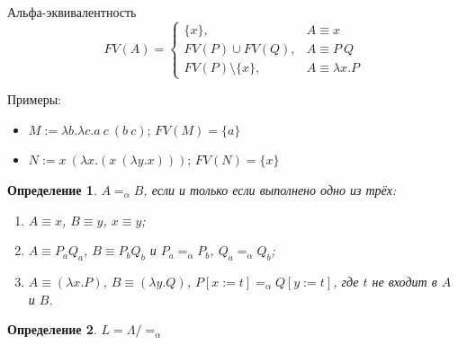 \documentclass[aspectratio=169]{beamer}
\newtheorem{dfn}{Определение}[section]
\begin{document}
\begin{frame}{Альфа-эквивалентность}
$$FV(A) = \left\{\begin{array}{ll} \{x\}, & A \equiv x\\
  FV(P)\cup FV(Q), & A \equiv P\ Q\\
  FV(P)\setminus\{x\}, & A \equiv \lambda x.P\end{array}\right.$$

Примеры: 
\begin{itemize}
\item $M := \lambda b.\lambda c.a\ c\ (b\ c)$; $FV(M) = \{a\}$
\item $N := x\ (\lambda x.(x\ (\lambda y.x)))$; $FV(N) = \{x\}$
\end{itemize}

\begin{dfn}$A=_\alpha B$, если и только если выполнено одно из трёх:
\begin{enumerate}
\item $A \equiv x$, $B \equiv y$, $x \equiv y$;
\item $A \equiv P_a Q_a$, $B \equiv P_b Q_b$ и $P_a =_\alpha P_b$, $Q_a =_\alpha Q_b$;
\item $A \equiv (\lambda x.P)$, $B \equiv (\lambda y.Q)$, $P[x := t] =_\alpha Q[y := t]$, где $t$ не входит в $A$ и $B$.
\end{enumerate}\end{dfn}

\begin{dfn}$L = \Lambda/=_\alpha$\end{dfn}
\end{frame}
\end{document}
